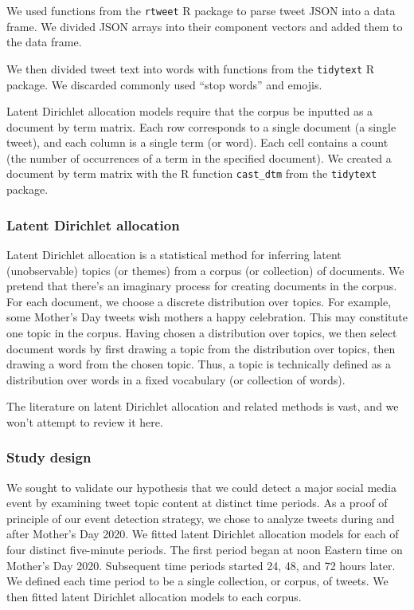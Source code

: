 \documentclass[
]{article}
\begin{document}
We used functions from the \texttt{rtweet} R package to parse tweet JSON
into a data frame. We divided JSON arrays into their component vectors
and added them to the data frame.

We then divided tweet text into words with functions from the
\texttt{tidytext} R package. We discarded commonly used ``stop words''
and emojis.

Latent Dirichlet allocation models require that the corpus be inputted
as a document by term matrix. Each row corresponds to a single document
(a single tweet), and each column is a single term (or word). Each cell
contains a count (the number of occurrences of a term in the specified
document). We created a document by term matrix with the R function
\texttt{cast\_dtm} from the \texttt{tidytext} package.

\hypertarget{latent-dirichlet-allocation}{%
\subsubsection{Latent Dirichlet
allocation}\label{latent-dirichlet-allocation}}

Latent Dirichlet allocation is a statistical method for inferring latent
(unobservable) topics (or themes) from a corpus (or collection) of
documents. We pretend that there's an imaginary process for creating
documents in the corpus. For each document, we choose a discrete
distribution over topics. For example, some Mother's Day tweets wish
mothers a happy celebration. This may constitute one topic in the
corpus. Having chosen a distribution over topics, we then select
document words by first drawing a topic from the distribution over
topics, then drawing a word from the chosen topic. Thus, a topic is
technically defined as a distribution over words in a fixed vocabulary
(or collection of words).

The literature on latent Dirichlet allocation and related methods is
vast, and we won't attempt to review it here.

\hypertarget{study-design}{%
\subsubsection{Study design}\label{study-design}}

We sought to validate our hypothesis that we could detect a major social
media event by examining tweet topic content at distinct time periods.
As a proof of principle of our event detection strategy, we chose to
analyze tweets during and after Mother's Day 2020. We fitted latent
Dirichlet allocation models for each of four distinct five-minute
periods. The first period began at noon Eastern time on Mother's Day
2020. Subsequent time periods started 24, 48, and 72 hours later. We
defined each time period to be a single collection, or corpus, of
tweets. We then fitted latent Dirichlet allocation models to each
corpus.
\end{document}
